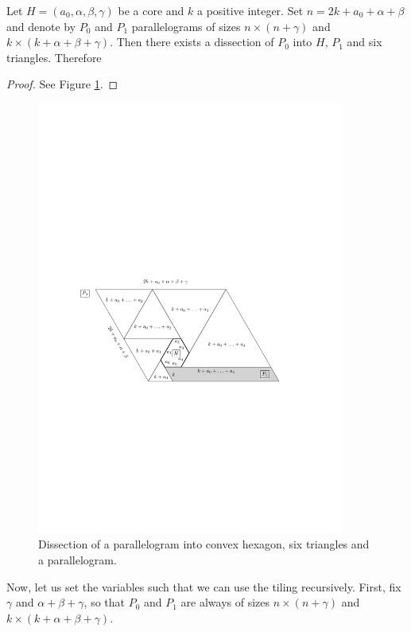 \begin{lem}
\label{lem:core-tiling}
Let $H = (a_0, \alpha, \beta, \gamma)$ be a core and $k$ a positive integer. Set $n = 2k+a_0+\alpha+\beta$ and denote by $P_0$ and $P_1$ parallelograms of sizes $n\times(n+\gamma)$ and $k\times(k+\alpha+\beta+\gamma)$. Then there exists a dissection of $P_0$ into $H$, $P_1$ and six triangles. Therefore
\end{lem}
\begin{proof}
See Figure \ref{fig:core-tiling1}.
\end{proof}

\begin{figure}[htb]
\centering
\includegraphics[width=0.9\textwidth]{img/core_tiling1.pdf}
\caption{Dissection of a parallelogram into convex hexagon, six triangles and a parallelogram.}
\label{fig:core-tiling1}
\end{figure}

Now, let us set the variables such that we can use the tiling recursively. First, fix $\gamma$ and $\alpha+\beta+\gamma$, so that $P_0$ and $P_1$ are always of sizes $n \times (n+\gamma)$ and $k \times (k+\alpha+\beta+\gamma)$.

